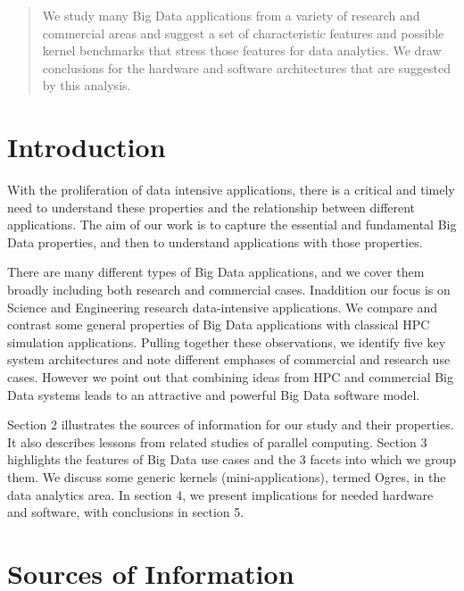 \documentclass{acm_proc_article-sp}
\begin{document}
\maketitle
\begin{abstract}
We study many Big Data applications from a variety of research and commercial areas and suggest a set of characteristic features and possible kernel benchmarks that stress those features for data analytics. We draw conclusions for the hardware and software architectures that are suggested by this analysis.
\end{abstract}


\section{Introduction}
With the proliferation of data intensive applications, there is a critical and timely need to understand these properties and the relationship between different applications. The aim of our work is to capture the essential and fundamental Big Data properties, and then to understand applications with those properties.

There are many different types of Big Data applications, and we cover them broadly including both research and commercial cases. Inaddition our focus is on Science and Engineering research data-intensive applications. We compare and contrast some general properties of Big Data applications with classical HPC simulation applications.  Pulling together these observations, we identify five key system architectures and note different emphases of commercial and research use cases. However we point out that combining ideas from HPC and commercial Big Data systems leads to an attractive and powerful Big Data software model.

Section 2 illustrates the sources of information for our study and their properties. It also describes lessons from related studies of parallel computing. Section 3 highlights the features of Big Data use cases and the 3 facets into which we group them. We discuss some generic kernels (mini-applications), termed Ogres, in the data analytics area. In section 4, we present implications for needed hardware and software, with conclusions in section 5.

\section{Sources of Information}
\end{document}
